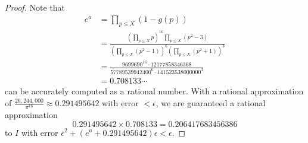 \documentclass[12pt]{article}
\begin{document}
\begin{proof}
Note that %
\begin{align*}
e^a &= \prod_{p \leq X} (1 - g(p)) \\
&= \frac{(\prod_{p \leq X} p)^{16} \prod_{p \leq X} (p^2 - 3)}{(\prod_{p \leq X} (p^2 - 1))^6 (\prod_{p \leq X} (p^2 + 1))^3} \\
&= \frac{9699690^{16} \cdot 12177858346368}{57789539942400^6 \cdot 141523538000000^3}\\
&= 0.708133\cdots
\end{align*}
can be accurately computed as a rational number. With a rational approximation of $\frac{26,244,000}{\pi^{16}} \approx 0.291495642$ with error $< \epsilon$, we are guaranteed a rational approximation
$$0.291495642 \times 0.708133 = 0.206417683456386$$
to $I$ with error $\epsilon^2 + (e^a + 0.291495642) \epsilon < \epsilon$.

\end{proof}

\unless\ifdefined\IsMainDocument
\end{document}

